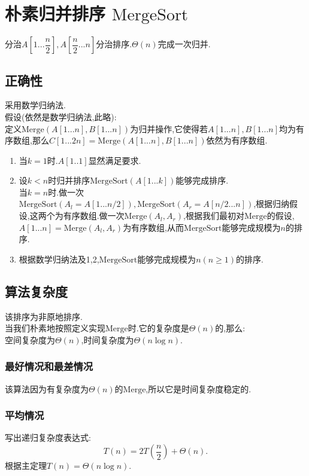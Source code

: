 \documentclass[UTF8]{ctexart}
\begin{document}
\newpage
\section{朴素归并排序 $\mathrm{MergeSort}$}
分治$A[1...\dfrac{n}{2}],A[\dfrac{n}{2}...n]$分治排序.$\Theta(n)$完成一次归并.
\subsection{正确性}
采用数学归纳法.\\
\indent
假设(依然是数学归纳法,此略):\\
\indent
定义$\mathrm{Merge}(A[1...n],B[1...n])$为归并操作,它使得若$A[1...n],B[1...n]$均为有序数组,那么$C[1...2n]=\mathrm{Merge}(A[1...n],B[1...n])$依然为有序数组.
\begin{enumerate}[1.]
\item 当$k=1$时.$A[1..1]$显然满足要求.
\item 设$k<n$时归并排序$\mathrm{MergeSort}(A[1...k])$能够完成排序.\\
当$k=n$时.做一次$\mathrm{MergeSort}(A_l=A[1...n/2]),\mathrm{MergeSort}(A_r=A[n/2...n])$,根据归纳假设,这两个为有序数组.做一次$\mathrm{Merge}(A_l,A_r)$,根据我们最初对$\mathrm{Merge}$的假设,$A[1...n]=\mathrm{Merge}(A_l,A_r)$为有序数组,从而$\mathrm{MergeSort}$能够完成规模为$n$的排序.
\item 根据数学归纳法及1,2,$\mathrm{MergeSort}$能够完成规模为$n(n\geqslant 1)$的排序.
\end{enumerate}
\subsection{算法复杂度}
该排序为非原地排序.\\
\indent
当我们朴素地按照定义实现$\mathrm{Merge}$时.它的复杂度是$\Theta(n)$的,那么:\\
\indent
空间复杂度为$\Theta(n)$,时间复杂度为$\Theta(n\log n)$.\\
\subsubsection{最好情况和最差情况}
该算法因为有复杂度为$\Theta(n)$的$\mathrm{Merge}$,所以它是时间复杂度稳定的.
\subsubsection{平均情况}
写出递归复杂度表达式:
$$
T(n)=2T(\frac{n}{2})+\Theta(n).
$$
根据主定理$T(n)=\Theta(n\log n)$.

\newpage
\end{document}
